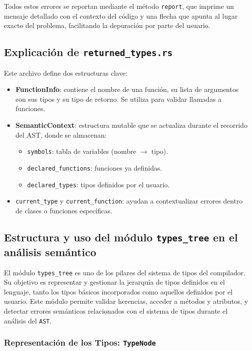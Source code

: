 \documentclass{article}
\begin{document}
Todos estos errores se reportan mediante el método \texttt{report}, que imprime un mensaje detallado con el contexto del código y una flecha que apunta al lugar exacto del problema, facilitando la depuración por parte del usuario.

\subsection{Explicación de \texttt{returned\_types.rs}}
Este archivo define dos estructuras clave:
\begin{itemize}
\item \textbf{FunctionInfo}: contiene el nombre de una función, su lista de argumentos con sus tipos y su tipo de retorno. Se utiliza para validar llamadas a funciones.
\item \textbf{SemanticContext}: estructura mutable que se actualiza durante el recorrido del AST, donde se almacenan:
\begin{itemize}
\item \texttt{symbols}: tabla de variables (nombre $\rightarrow$ tipo).
\item \texttt{declared\_functions}: funciones ya definidas.
\item \texttt{declared\_types}: tipos definidos por el usuario.
\end{itemize}
\item \texttt{current\_type} y \texttt{current\_function}: ayudan a contextualizar errores dentro de clases o funciones específicas.
\end{itemize}

\subsection{Estructura y uso del módulo \texttt{types\_tree} en el análisis semántico}

El módulo \texttt{types\_tree} es uno de los pilares del sistema de tipos del compilador. Su objetivo es representar y gestionar la jerarquía de tipos definidos en el lenguaje, tanto los tipos básicos incorporados como aquellos definidos por el usuario. Este módulo permite validar herencias, acceder a métodos y atributos, y detectar errores semánticos relacionados con el sistema de tipos durante el análisis del \texttt{AST}.

\subsubsection*{Representación de los Tipos: \texttt{TypeNode}}
\end{document}
